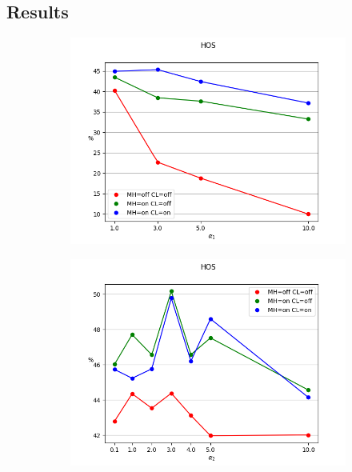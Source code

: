 \documentclass[10pt,twocolumn,letterpaper]{article}
\begin{document}
\subsection{Results}
\label{sec:results}
\begin{figure}[!htb]
  \centering
  \begin{subfigure}[!htb]{0.35\textwidth}
    \includegraphics[trim=0 0 0 2cm, clip, width=\linewidth]{hos-a1.png}
  \end{subfigure}
  \begin{subfigure}[!htb]{0.35\textwidth}
    \includegraphics[trim=0 0 0 2cm, clip, width=\linewidth]{hos-a2.png}
  \end{subfigure}
  \begin{subfigure}[!htb]{0.35\textwidth}

\end{subfigure}
\end{figure}
\end{document}
